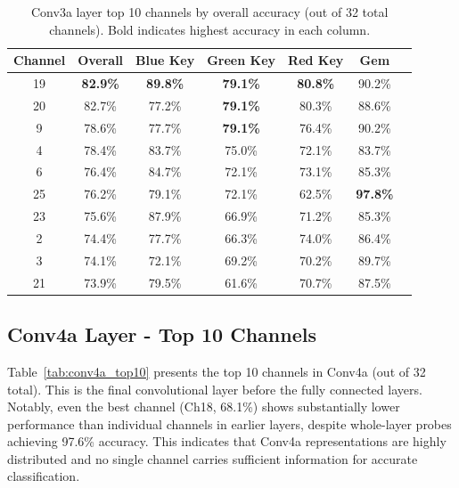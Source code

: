 \documentclass[12pt,a4paper]{report}
\begin{document}
\begin{table}[H]
\centering
\caption[Conv3a top 10 channel probe accuracies]{Conv3a layer top 10 channels by overall accuracy (out of 32 total channels). Bold indicates highest accuracy in each column.}
\label{tab:conv3a_top10}
\begin{tabular}{ccccccc}
\toprule
Channel & Overall & Blue Key & Green Key & Red Key & Gem \\
\midrule
19 & \textbf{82.9\%} & \textbf{89.8\%} & \textbf{79.1\%} & \textbf{80.8\%} & 90.2\% \\
20 & 82.7\% & 77.2\% & \textbf{79.1\%} & 80.3\% & 88.6\% \\
9 & 78.6\% & 77.7\% & \textbf{79.1\%} & 76.4\% & 90.2\% \\
4 & 78.4\% & 83.7\% & 75.0\% & 72.1\% & 83.7\% \\
6 & 76.4\% & 84.7\% & 72.1\% & 73.1\% & 85.3\% \\
25 & 76.2\% & 79.1\% & 72.1\% & 62.5\% & \textbf{97.8\%} \\
23 & 75.6\% & 87.9\% & 66.9\% & 71.2\% & 85.3\% \\
2 & 74.4\% & 77.7\% & 66.3\% & 74.0\% & 86.4\% \\
3 & 74.1\% & 72.1\% & 69.2\% & 70.2\% & 89.7\% \\
21 & 73.9\% & 79.5\% & 61.6\% & 70.7\% & 87.5\% \\
\bottomrule
\end{tabular}
\end{table}

\subsection{Conv4a Layer - Top 10 Channels}

Table~\ref{tab:conv4a_top10} presents the top 10 channels in Conv4a (out of 32 total). This is the final convolutional layer before the fully connected layers. Notably, even the best channel (Ch18, 68.1\%) shows substantially lower performance than individual channels in earlier layers, despite whole-layer probes achieving 97.6\% accuracy. This indicates that Conv4a representations are highly distributed and no single channel carries sufficient information for accurate classification.
\end{document}
